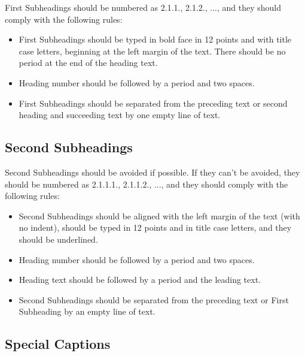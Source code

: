 \documentclass[a4paper,oneside,12pt]{report}
\numberwithin{equation}{chapter}
\begin{document}
First Subheadings should be numbered as 2.1.1., 2.1.2., ..., and they should comply with the following rules:

\begin{itemize}
\item First Subheadings should be typed in bold face in 12 points and with title
case letters, beginning at the left
margin of the text. There should be no period at the end of the heading text.
\item Heading number should be followed by a period and two spaces.
\item First Subheadings should be separated from the preceding text or second heading and succeeding text by one empty line of text.
\end{itemize}


\subsection{Second Subheadings}

Second Subheadings should be avoided if possible. If they can't be avoided, they should be numbered as 2.1.1.1., 2.1.1.2., ..., and they should comply with the following rules:
\begin{itemize}
\item Second Subheadings should be aligned with the left margin of the text (with no indent), should be typed in 12 points and in title case letters, and they should be underlined.
\item Heading number should be followed by a period and
two spaces.
\item Heading text should be followed by a period and the leading text.
\item Second Subheadings should be separated from the preceding text or First Subheading by an empty line of text.
\end{itemize}


\subsection {Special Captions}
\end{document}
